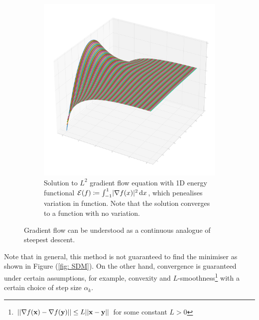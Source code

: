 \documentclass[../dissertation.tex]{subfiles}
\begin{document}
\begin{figure}[tbp]
\begin{subfigure}[b]{0.4\textwidth}
        \includegraphics[width=\textwidth]{sections/gradientFlowImgs/gf}
        \caption{Solution to $L^2$ gradient flow equation with 1D energy functional $\mathcal{E} (f) \coloneqq \int_{-1}^1 \lvert\nabla f(x)\lvert^2 \, \text{d} x$, which penealises variation in function. Note that the solution converges to a function with no variation.}
        \label{fig: GF}
    \end{subfigure}
    \caption{Gradient flow can be understood as a continuous analogue of steepest descent.}
\end{figure}
Note that in general, this method is not guaranteed to find the minimiser as shown in Figure (\ref{fig: SDM}).
On the other hand, convergence is guaranteed under certain assumptions, for example, convexity and $L$-smoothness\footnote{$\lvert \lvert \nabla f(\mathbf{x}) - \nabla f(\mathbf{y}) \rvert \rvert \leq L \lvert \lvert \mathbf{x}-\mathbf{y} \rvert \rvert$ for some constant $L > 0$}
with a certain choice of step size $\alpha_k$.
\end{document}
